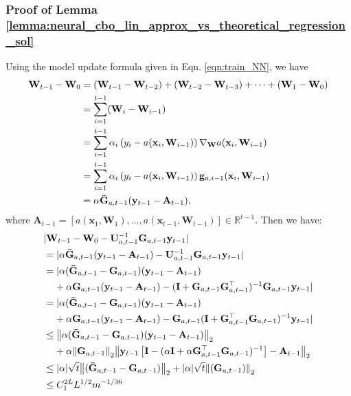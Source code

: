 \subsubsection{Proof of Lemma \ref{lemma:neural_cbo_lin_approx_vs_theoretical_regression_sol}}

Using the model update formula given in Eqn. \ref{eqn:train_NN}, we have 
\begin{align*}
    \mathbf{W}_{t-1} - \mathbf{W}_0 &= (\mathbf{W}_{t-1} - \mathbf{W}_{t-2}) + (\mathbf{W}_{t-2} - \mathbf{W}_{t-3})  + \dots + (\mathbf{W}_1 - \mathbf{W}_0) 
    \\
    &= \sum_{i=1}^{t-1}  (\mathbf{W}_{i} -  \mathbf{W}_{i-1}) 
    \\
    &= \sum_{i=1}^{t-1}  \alpha_i \left(y_i - a(\mathbf{x}_i, \mathbf{W}_{i-1})\right) \nabla_\mathbf{W} a(\mathbf{x}_i, \mathbf{W}_{i-1}) 
    \\
    & = \sum_{i=1}^{t-1}  \alpha_i \left(y_i - a(\mathbf{x}_i, \mathbf{W}_{i-1})\right) \mathbf{g}_{a, i-1} (\mathbf{x}_i, \mathbf{W}_{i-1}) 
    \\
    & = \alpha \mathbf{\Bar{G}}_{a, t-1} (\mathbf{y}_{t-1} - \mathbf{A}_{t-1}),
\end{align*}
where $\mathbf{A}_{t-1} = [a(\mathbf{x}_1, \mathbf{W}_1), \dots, a(\mathbf{x}_{t-1}, \mathbf{W}_{t-1})] \in \mathbb{R}^{t-1}$.  Then we have:
\begin{align*}
    & \lvert \mathbf{W}_{t-1} - \mathbf{W}_0 - \mathbf{U}_{a,t-1}^{-1}
    \mathbf{G}_{a,t-1} \mathbf{y}_{t-1} \rvert 
    \\
    & = \lvert  \alpha \mathbf{\Bar{G}}_{a, t-1} (\mathbf{y}_{t-1} - \mathbf{A}_{t-1}) - \mathbf{U}_{a,t-1}^{-1} \mathbf{G}_{a,t-1} \mathbf{y}_{t-1} \rvert 
    \\
    & = \lvert  \alpha (\mathbf{\Bar{G}}_{a, t-1} - \mathbf{G}_{a, t-1}) (\mathbf{y}_{t-1} - \mathbf{A}_{t-1}) 
\\
    & \;\;\;\; + \alpha \mathbf{G}_{a, t-1} (\mathbf{y}_{t-1} - \mathbf{A}_{t-1}) - (\mathbf{I} + \mathbf{G}_{a,t-1} \mathbf{G}_{a,t-1}^\top)^{-1} \mathbf{G}_{a,t-1} \mathbf{y}_{t-1} \rvert
\\
    & = \lvert  \alpha (\mathbf{\Bar{G}}_{a, t-1} - \mathbf{G}_{a, t-1}) (\mathbf{y}_{t-1} - \mathbf{A}_{t-1}) 
\\
    & \;\;\;\; + \alpha \mathbf{G}_{a, t-1} (\mathbf{y}_{t-1} - \mathbf{A}_{t-1}) - \mathbf{G}_{a,t-1}(\mathbf{I} + \mathbf{G}_{a,t-1}^\top \mathbf{G}_{a,t-1} )^{-1} \mathbf{y}_{t-1} \rvert
\\
    & \le \norm{\alpha (\mathbf{\Bar{G}}_{a, t-1} - \mathbf{G}_{a, t-1}) (\mathbf{y}_{t-1} - \mathbf{A}_{t-1})}_2 
\\
    & \;\;\;\; + \alpha \norm{\mathbf{G}_{a, t-1}}_2 \norm{ \mathbf{y}_{t-1} \left[\mathbf{I} - (\alpha\mathbf{I} + \alpha \mathbf{G}_{a,t-1}^\top \mathbf{G}_{a,t-1} )^{-1} \right] - \mathbf{A}_{t-1}}_2
\\
    & \le \lvert \alpha \rvert \sqrt{t} \norm{(\mathbf{\Bar{G}}_{a, t-1} - \mathbf{G}_{a, t-1})}_2 + \lvert \alpha \rvert \sqrt{t} \norm{(\mathbf{G}_{a, t-1})}_2
\\
    & \le C_1^{2L} L^{1/2} m^{-1/36}
\end{align*}
